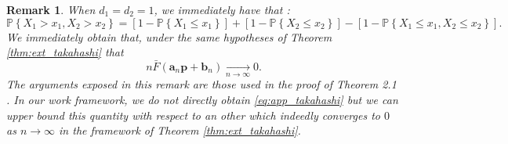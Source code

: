 \documentclass[11pt]{article}
\newtheorem{remark}{Remark}
\begin{document}
	\begin{remark}
		\label{rmk:takahashi}
		When $d_1 = d_2 = 1$, we immediately have that :
		\begin{equation*}
			\mathbb{P} \left\{ X_1 > x_1, X_2 > x_2  \right\} = \left[ 1-\mathbb{P} \left\{ X_1 \leq x_1 \right\} \right] + \left[ 1 - \mathbb{P} \left\{ X_2 \leq x_2\right\} \right] - \left[ 1- \mathbb{P}\left\{ X_1 \leq x_1, X_2 \leq x_2 \right\} \right].
		\end{equation*}
		We immediately obtain that, under the same hypotheses of Theorem \ref{thm:ext_takahashi} that
		\begin{equation}
			\label{eq:app_takahashi}
			n \bar{F}(\textbf{a}_n \textbf{p} + \textbf{b}_n) \underset{n \rightarrow \infty}{\longrightarrow} 0.
		\end{equation}
		The arguments exposed in this remark are those used in the proof of Theorem 2.1 \cite{takahashi1994asymptotic}. In our work framework, we do not directly obtain \eqref{eq:app_takahashi} but we can upper bound this quantity with respect to an other which indeedly converges to $0$ as $n\rightarrow \infty$ in the framework of Theorem \ref{thm:ext_takahashi}.
		
	\end{remark}
\end{document}
